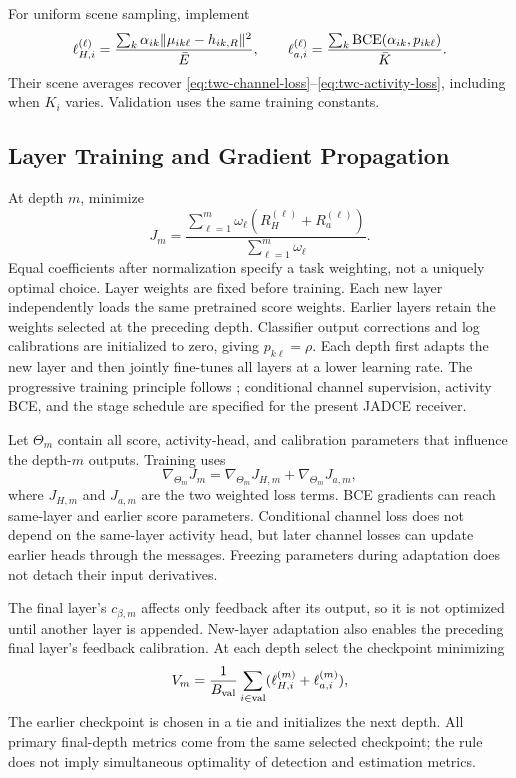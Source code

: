 For uniform scene sampling, implement
\begin{equation}
 \ell_{H,i}^{(\ell)}
 =\frac{\sum_k\alpha_{ik}\|\mu_{ik\ell}-h_{ik,R}\|^2}{\bar E},\qquad
 \ell_{a,i}^{(\ell)}
 =\frac{\sum_k{\rm BCE}(\alpha_{ik},p_{ik\ell})}{\bar K}.
 \label{eq:twc-scene-loss}
\end{equation}
Their scene averages recover
\eqref{eq:twc-channel-loss}--\eqref{eq:twc-activity-loss}, including
when $K_i$ varies. Validation uses the same training constants.

\subsection{Layer Training and Gradient Propagation}

At depth $m$, minimize
\begin{equation}
 J_m=\frac{\sum_{\ell=1}^{m}\omega_\ell
                     (R_H^{(\ell)}+R_a^{(\ell)})}
                 {\sum_{\ell=1}^{m}\omega_\ell}.
 \label{eq:twc-layer-objective}
\end{equation}
Equal coefficients after normalization specify a task weighting,
not a uniquely optimal choice. Layer weights are fixed before training.
Each new layer independently loads the same pretrained score weights.
Earlier layers retain the weights selected at the preceding depth.
Classifier output corrections and log calibrations are initialized
to zero, giving $p_{k\ell}=\rho$. Each depth first adapts the new
layer and then jointly fine-tunes all layers at a lower learning rate.
The progressive training principle follows \cite[Sec.~III-D]{wei2026};
conditional channel supervision, activity BCE, and the stage schedule
are specified for the present JADCE receiver.

Let $\Theta_m$ contain all score, activity-head, and calibration
parameters that influence the depth-$m$ outputs. Training uses
\begin{equation}
 \nabla_{\Theta_m}J_m
 =\nabla_{\Theta_m}J_{H,m}+\nabla_{\Theta_m}J_{a,m},
 \label{eq:twc-joint-gradient}
\end{equation}
where $J_{H,m}$ and $J_{a,m}$ are the two weighted loss terms.
BCE gradients can reach same-layer and earlier score parameters.
Conditional channel loss does not depend on the same-layer activity
head, but later channel losses can update earlier heads through the
messages. Freezing parameters during adaptation does not detach
their input derivatives.

The final layer's $c_{\beta,m}$ affects only feedback after its output,
so it is not optimized until another layer is appended.
New-layer adaptation also enables the preceding final layer's feedback
calibration. At each depth select the checkpoint minimizing
\begin{equation}
 V_m=\frac{1}{B_{\rm val}}\sum_{i\in{\rm val}}
     (\ell_{H,i}^{(m)}+\ell_{a,i}^{(m)}),
 \label{eq:twc-selection}
\end{equation}
The earlier checkpoint is chosen in a tie and initializes the next depth.
All primary final-depth metrics come from the same selected checkpoint;
the rule does not imply simultaneous optimality of detection and
estimation metrics.
